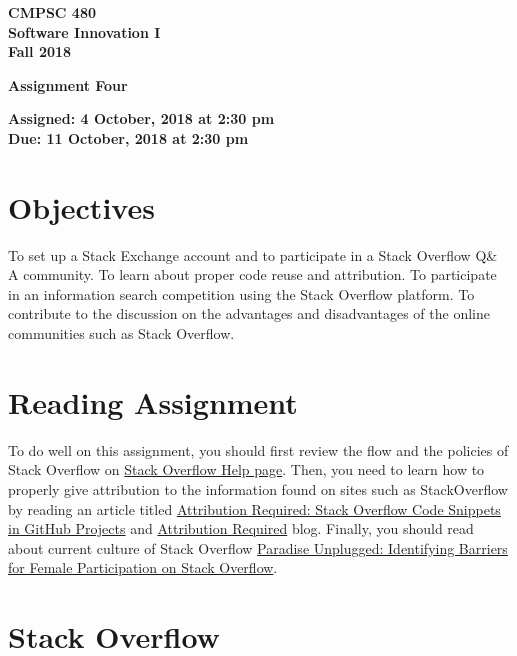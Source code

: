 \documentclass[11pt]{article}
\newcommand{\assignmentduedate}{11 October}
\newcommand{\assignmentassignedate}{ 4 October}
\newcommand{\assignmentnumber}{Four}
\newcommand{\labyear}{2018}
\newcommand{\labtime}{2:30 pm}
\newcommand{\assigneddate}{Assigned:  \assignmentassignedate, \labyear{} at \labtime{}}
\newcommand{\duedate}{Due:  \assignmentduedate, \labyear{} at \labtime{}}
\newcommand{\labtitle}[1]
{
  \begin{center}
    \begin{center}
      \bf
      CMPSC 480 \\ Software Innovation I\\
      Fall 2018\\
      \medskip
    \end{center}
    \bf
    #1
  \end{center}
}
\begin{document}
\thispagestyle{empty}

\labtitle{Assignment \assignmentnumber{} }
\begin{center} \textbf{ \assigneddate{} \\ \duedate{} } \end{center} 
\noindent \textbf{ }

\section*{Objectives}

To set up a Stack Exchange account and to participate in a Stack Overflow Q\& A community. To learn about proper code reuse and attribution. To participate in an information search competition using the Stack Overflow platform. To contribute to the discussion on the advantages and disadvantages of the online communities such as Stack Overflow.

\section*{Reading Assignment}

To do well on this assignment, you
should first review the flow and the policies of Stack Overflow on \href{https://stackoverflow.com/help}{Stack Overflow Help page}.
Then, you need to learn how to properly give attribution to the information found on sites such as StackOverflow by reading an article titled \href{
https://ieeexplore.ieee.org/document/7965289/}{Attribution Required: Stack Overflow Code Snippets in GitHub Projects} and \href{
https://stackoverflow.blog/2009/06/25/attribution-required}{Attribution Required} blog. Finally, you should read about current culture of Stack Overflow \href{http://www.pgbovine.net/publications/stackoverflow-female-participation_FSE-2016.pdf}{Paradise Unplugged: Identifying Barriers for Female
Participation on Stack Overflow}.

\section*{Stack Overflow}
\end{document}
